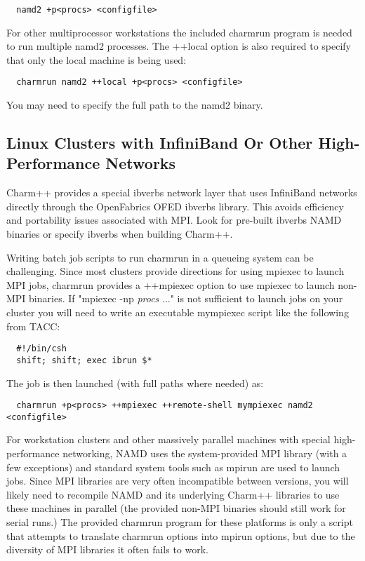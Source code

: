 \begin{verbatim}
  namd2 +p<procs> <configfile>
\end{verbatim}

For other multiprocessor workstations the included charmrun program is
needed to run multiple namd2 processes.  The ++local option is also
required to specify that only the local machine is being used:

\begin{verbatim}
  charmrun namd2 ++local +p<procs> <configfile>
\end{verbatim}

You may need to specify the full path to the namd2 binary.

\subsection{Linux Clusters with InfiniBand Or Other High-Performance Networks}

Charm++ provides a special ibverbs network layer that uses InfiniBand
networks directly through the OpenFabrics OFED ibverbs library.  This
avoids efficiency and portability issues associated with MPI.  Look for
pre-built ibverbs NAMD binaries or specify ibverbs when building Charm++.

Writing batch job scripts to run charmrun in a queueing system can be
challenging.  Since most clusters provide directions for using mpiexec
to launch MPI jobs, charmrun provides a ++mpiexec option to use mpiexec
to launch non-MPI binaries.  If "mpiexec -np {\em procs} ..." is not
sufficient to launch jobs on your cluster you will need to write an
executable mympiexec script like the following from TACC:

\begin{verbatim}
  #!/bin/csh
  shift; shift; exec ibrun $*
\end{verbatim}

The job is then launched (with full paths where needed) as:

\begin{verbatim}
  charmrun +p<procs> ++mpiexec ++remote-shell mympiexec namd2 <configfile>
\end{verbatim}

For workstation clusters and other massively parallel machines with
special high-performance networking, NAMD uses the system-provided MPI
library (with a few exceptions) and standard system tools such as mpirun
are used to launch jobs.  Since MPI libraries are very often incompatible
between versions, you will likely need to recompile NAMD and its
underlying Charm++ libraries to use these machines in parallel (the
provided non-MPI binaries should still work for serial runs.) The provided
charmrun program for these platforms is only a script that attempts to
translate charmrun options into mpirun options, but due to the diversity
of MPI libraries it often fails to work.

